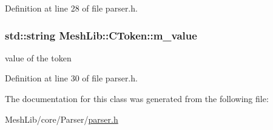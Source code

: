 Definition at line 28 of file parser.\+h.

\subsubsection[{\texorpdfstring{m\+\_\+value}{m_value}}]{\setlength{\rightskip}{0pt plus 5cm}std\+::string Mesh\+Lib\+::\+C\+Token\+::m\+\_\+value}\hypertarget{class_mesh_lib_1_1_c_token_a93193611239a7d9f5eba7d002dcd93e9}{}\label{class_mesh_lib_1_1_c_token_a93193611239a7d9f5eba7d002dcd93e9}
value of the token 

Definition at line 30 of file parser.\+h.



The documentation for this class was generated from the following file\+:\begin{DoxyCompactItemize}
\item 
Mesh\+Lib/core/\+Parser/\hyperlink{parser_8h}{parser.\+h}\end{DoxyCompactItemize}
